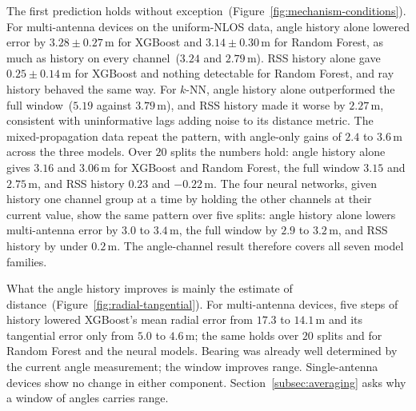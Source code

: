 The first prediction holds without exception~(Figure~\ref{fig:mechanism-conditions}). For multi-antenna devices on the uniform-NLOS data, angle history alone lowered error by $3.28 \pm 0.27\,\text{m}$ for XGBoost and $3.14 \pm 0.30\,\text{m}$ for Random Forest, as much as history on every channel~($3.24$ and $2.79\,\text{m}$). RSS history alone gave $0.25 \pm 0.14\,\text{m}$ for XGBoost and nothing detectable for Random Forest, and ray history behaved the same way. For $k$-NN, angle history alone outperformed the full window~($5.19$ against $3.79\,\text{m}$), and RSS history made it worse by $2.27\,\text{m}$, consistent with uninformative lags adding noise to its distance metric. The mixed-propagation data repeat the pattern, with angle-only gains of $2.4$ to $3.6\,\text{m}$ across the three models. Over $20$ splits the numbers hold: angle history alone gives $3.16$ and $3.06\,\text{m}$ for XGBoost and Random Forest, the full window $3.15$ and $2.75\,\text{m}$, and RSS history $0.23$ and $-0.22\,\text{m}$. The four neural networks, given history one channel group at a time by holding the other channels at their current value, show the same pattern over five splits: angle history alone lowers multi-antenna error by $3.0$ to $3.4\,\text{m}$, the full window by $2.9$ to $3.2\,\text{m}$, and RSS history by under $0.2\,\text{m}$. The angle-channel result therefore covers all seven model families.

What the angle history improves is mainly the estimate of distance~(Figure~\ref{fig:radial-tangential}). For multi-antenna devices, five steps of history lowered XGBoost's mean radial error from $17.3$ to $14.1\,\text{m}$ and its tangential error only from $5.0$ to $4.6\,\text{m}$; the same holds over $20$ splits and for Random Forest and the neural models. Bearing was already well determined by the current angle measurement; the window improves range. Single-antenna devices show no change in either component. Section~\ref{subsec:averaging} asks why a window of angles carries range.

